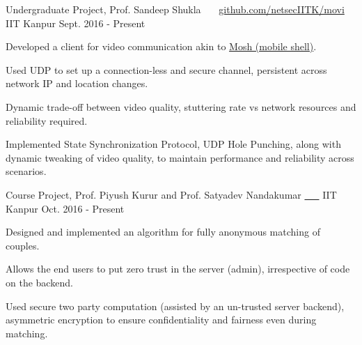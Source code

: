 


\begin{cventries}


  \cventry
  {Undergraduate Project, Prof. Sandeep Shukla}
  {\href{https://github.com/netsecIITK/moVi}{}
    \ \ \ \normalfont\href{https://github.com/netsecIITK/moVi}
    {github.com/netsecIITK/movi}}
  {IIT Kanpur}
  {Sept. 2016 - Present}
  {
    \begin{cvitems}
    \item Developed a client for video communication
      akin to \href{https://mosh.org/}{Mosh (mobile shell)}.
    \item Used UDP to set up a connection-less and secure channel,
      persistent across network IP and location changes.
    \item Dynamic trade-off between video quality, stuttering rate vs network
      resources and reliability required.
    \item Implemented State Synchronization Protocol, UDP Hole
      Punching, along with dynamic tweaking of video quality, to
      maintain performance and reliability across scenarios.
    \end{cvitems}
  }

  \cventry
  {Course Project, Prof. Piyush Kurur and
    Prof. Satyadev Nandakumar}
  {\href{https://github.com/pclubiitk/puppy-love}{
      \ \ \ }}
  {IIT Kanpur}
  {Oct. 2016 - Present}
  {
    \begin{cvitems}
      \item Designed and implemented an algorithm
        for fully anonymous matching of couples.
      \item Allows the end users to put zero trust in the server
        (admin), irrespective of code on the backend.
      \item Used secure two party computation (assisted by an
        un-trusted server backend), asymmetric encryption to ensure
        confidentiality and fairness even during matching.
    \end{cvitems}
  }


\end{cventries}
